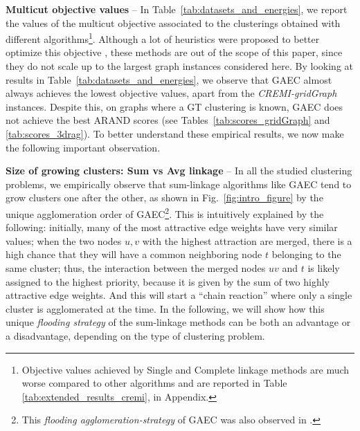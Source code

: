 \textbf{Multicut objective values} -- In Table~\ref{tab:datasets_and_energies}, we report the values of the multicut objective associated to the clusterings obtained with different \algname{} algorithms\footnote{Objective values achieved by Single and Complete linkage methods are much worse compared to other algorithms and are reported in Table \ref{tab:extended_results_cremi}, in Appendix.}. Although a lot of heuristics were proposed to better optimize this objective \cite{beier2016efficient,beier2014cut,kernighan1970efficient}, these methods are out of the scope of this paper, since they do not scale up to the largest graph instances considered here. By looking at results in Table~\ref{tab:datasets_and_energies}, we observe that GAEC almost always achieves the lowest objective values, apart from the \emph{CREMI-gridGraph} instances. Despite this, on graphs where a GT clustering is known, GAEC does not achieve the best ARAND scores (see Tables~\ref{tab:scores_gridGraph} and \ref{tab:scores_3drag}). 
To better understand these empirical results, we now make the following important observation.

\textbf{Size of growing clusters: Sum vs Avg linkage} -- 
In all the studied clustering problems, we empirically observe that sum-linkage algorithms like GAEC tend to grow clusters one after the other, as shown in Fig.\ \ref{fig:intro_figure} by the unique agglomeration order of GAEC\footnote{This \emph{flooding agglomeration-strategy} of GAEC was also observed in \cite{kardoostsolving}.}. This is intuitively explained by the  following: initially, many of the most attractive edge weights have very similar values; when the two nodes $u,v$ with the highest attraction are merged, there is a high chance that they will have a common neighboring node $t$ belonging to the same cluster; thus, the interaction between the merged nodes $uv$ and $t$ is likely assigned to the highest priority, because it is given by the sum of two highly attractive edge weights. And this will start a ``chain reaction'' where only a single cluster is agglomerated at the time. 
In the following, we will show how this unique \emph{flooding strategy} of the sum-linkage methods can be both an advantage or a disadvantage, depending on the type of clustering problem. 

